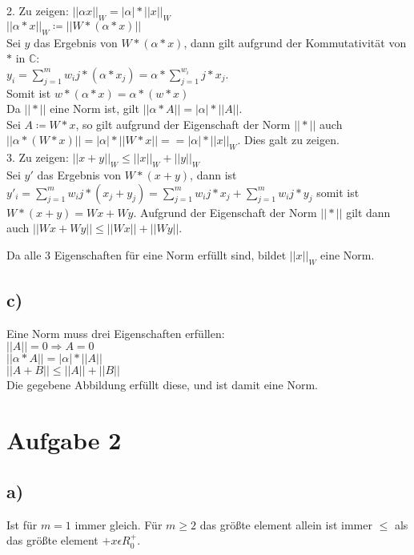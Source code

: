 \documentclass[10pt,a4paper]{article}
\begin{document}
2. Zu zeigen: $||\alpha x||_W = |\alpha|*||x||_W$\\

$||\alpha*x||_W \coloneqq || W * ( \alpha * x )||$\\
Sei $y$ das Ergebnis von $W*(\alpha * x)$, dann gilt aufgrund der Kommutativität von $*$ in $\mathbb{C}$:\\ 
$y_i = \sum_{j=1}^m w_ij * (\alpha * x_j) = \alpha*\sum_{j=1}^{w_i}j*x_j$.\\ 
Somit ist $w*(\alpha * x) = \alpha *(w*x)$\\

Da $||*||$ eine Norm ist, gilt $||\alpha*A|| = |\alpha|*||A||$.\\
Sei $A\coloneqq W*x$, so gilt aufgrund der Eigenschaft der Norm $||*||$ auch $||\alpha*(W*x)|| = |\alpha|*||W*x|| =  = |\alpha|*||x||_W$. Dies galt zu zeigen.\\

3. Zu zeigen: $||x+y||_W \leq ||x||_W +||y||_W$\\

Sei $y'$ das Ergebnis von $W*(x+y)$, dann ist $y'_i = \sum_{j=1}^m w_ij * ( x_j + y_j ) = \sum_{j=1}^m w_ij * x_j + \sum_{j=1}^m w_ij * y_j$ somit ist $W*(x+y) = Wx + Wy$. Aufgrund der Eigenschaft der Norm $||*||$ gilt dann auch $||Wx + Wy|| \leq ||Wx|| + ||Wy||$.

Da alle 3 Eigenschaften für eine Norm erfüllt sind, bildet $||x||_W$ eine Norm.

\subsection*{c)}
Eine Norm muss drei Eigenschaften erfüllen:\\
$||A|| = 0 \Rightarrow A = 0$\\
$||\alpha*A|| = |\alpha|*||A||$\\
$||A+B|| \leq ||A|| + ||B||$\\
Die gegebene Abbildung erfüllt diese, und ist damit eine Norm.

\section*{Aufgabe 2}
\subsection*{a)}
Ist für $m=1$ immer gleich.
Für $m \geq 2$ das größte element allein ist immer $\leq$ als das größte element $+ x\epsilon R_0^+$.
\end{document}
